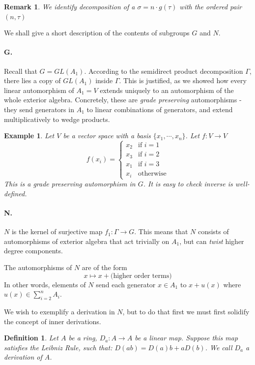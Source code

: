 \documentclass[12pt]{article}
\newtheorem{definition}[theorem]{Definition}
\newtheorem{example}[theorem]{Example}
\newtheorem{remark}[theorem]{Remark}
\numberwithin{theorem}{section}
\numberwithin{equation}{theorem}
\begin{document}
\begin{remark}
    We identify decomposition of a $\sigma = n \cdot g(\tau)$ with the ordered pair $(n, \tau)$    
\end{remark}

We shall give a short description of the contents of subgroups $G$ and $N$.
\paragraph{G.}
    Recall that $G = GL(A_1)$. According to the semidirect product decomposition $\Gamma$, there lies a copy of $GL(A_1)$ inside $\Gamma$. This is justified, as we showed how every linear automorphism of $A_1 = V$ extends uniquely to an automorphism of the whole exterior algebra. Concretely, these are \emph{grade preserving} automorphisms - they send generators in $A_1$ to linear combinations of generators, and extend multiplicatively to wedge products.

    \begin{example}
         Let $V$ be a vector space with a basis $\{x_1, \cdots, x_n\}$. Let $f : V \to V$
         $$
            f(x_i) = \begin{cases}
                x_2 & \text{if } i = 1\\
                x_3 & \text{if } i = 2\\
                x_1 & \text{if } i = 3\\
                x_i & \text{otherwise}
            \end{cases}
        $$
        This is a grade preserving automorphism in $G$. It is easy to check inverse is well-defined.
    \end{example}

    \paragraph{N.}
    $N$ is the kernel of surjective map $f_1: \Gamma \to G$. This means that $N$ consists of automorphisms of exterior algebra that act trivially on $A_1$, but can \emph{twist} higher degree components.

    The automorphisms of $N$ are of the form
    $$
    x \mapsto x + \text{(higher order terms)}
    $$
    In other words, elements of $N$ send each generator $x \in A_1$ to $x + u(x)$ where $u(x) \in \sum_{i=2}^n A_i$.

    We wish to exemplify a derivation in $N$, but to do that first we must first solidify the concept of inner derivations.
    \begin{definition}
    Let $A$ be a ring, $D_a : A \to A$ be a linear map. Suppose this map satisfies the Leibniz Rule, such that: $D(ab) = D(a)b + aD(b)$. We call $D_a$ a derivation of $A$.
    \end{definition} 
    
\end{document}
